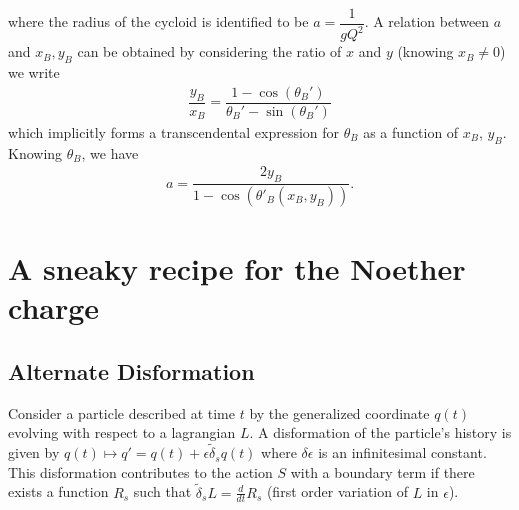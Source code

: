 \documentclass[10pt, a4paper]{article}
\begin{document}
where the radius of the cycloid is identified to be $a = \dfrac{1}{gQ^2}$. A relation between $a$ and $x_B, y_B$ can be obtained by considering the ratio of $x$ and $y$ (knowing $x_B \neq 0$) we write 
\begin{align*}
    \dfrac{y_B}{x_B} = \dfrac{1 - \cos(\theta_B')}{\theta_B'-\sin (\theta_B')}
\end{align*}
which implicitly forms a transcendental expression for $\theta_B$ as a function of $x_B$, $y_B$. Knowing $\theta_B$, we have 
\begin{align*}
    a = \dfrac{2y_B}{1 - \cos(\theta'_B(x_B, y_B))}. 
\end{align*}



\newpage

\section{A sneaky recipe for the Noether charge}
%
\subsection{Alternate Disformation}
Consider a particle described at time $t$ by the generalized coordinate $q(t)$ evolving with respect to a lagrangian $L$. A disformation of the particle's history is given by $q(t) \mapsto q' = q(t) +\epsilon \tilde{\delta}_s q(t)$ where $\delta \epsilon$ is an infinitesimal constant. This disformation contributes to the action $S$ with a boundary term if there exists a function $R_s$ such that $\tilde{\delta}_s L = \frac{d}{dt}R_s$ (first order variation of $L$ in $\epsilon$).
\end{document}
